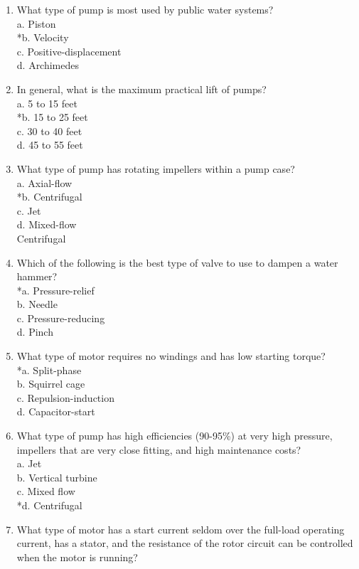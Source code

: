 \begin{enumerate}[1.]
\item What type of pump is most used by public water systems?\\
a. Piston\\
*b. Velocity\\
c. Positive-displacement\\
d. Archimedes\\
\item In general, what is the maximum practical lift of pumps?\\
a. 5 to 15 feet\\
*b. 15 to 25 feet\\
c. 30 to 40 feet\\
d. 45 to 55 feet\\
\item What type of pump has rotating impellers within a pump case?\\
a. Axial-flow\\
*b. Centrifugal\\
c. Jet\\
d. Mixed-flow\\
 Centrifugal\\
\item Which of the following is the best type of valve to use to dampen a water hammer?\\
*a. Pressure-relief\\
b. Needle\\
c. Pressure-reducing\\
d. Pinch\\
\item What type of motor requires no windings and has low starting torque?\\
*a. Split-phase\\
b. Squirrel cage\\
c. Repulsion-induction\\
d. Capacitor-start\\
\item What type of pump has high efficiencies (90-95\%) at very high pressure, impellers that are very close fitting, and high maintenance costs?\\
a. Jet\\
b. Vertical turbine\\
c. Mixed flow\\
*d. Centrifugal\\
\item What type of motor has a start current seldom over the full-load operating current, has a stator, and the resistance of the rotor circuit can be controlled when the motor is running?\\

\end{enumerate}
